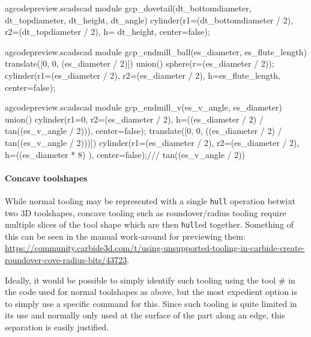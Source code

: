 \documentclass{ltxdoc}
\begin{document}
\lstset{firstnumber=\thegcpscad}
\begin{writecode}{a}{gcodepreview.scad}{scad}
module gcp_dovetail(dt_bottomdiameter, dt_topdiameter, dt_height, dt_angle) {
  cylinder(r1=(dt_bottomdiameter / 2), r2=(dt_topdiameter / 2), h= dt_height, center=false);
}

\end{writecode}
\addtocounter{gcpscad}{4}

\lstset{firstnumber=\thegcpscad}
\begin{writecode}{a}{gcodepreview.scad}{scad}
module gcp_endmill_ball(es_diameter, es_flute_length) {
  translate([0, 0, (es_diameter / 2)]){
    union(){
      sphere(r=(es_diameter / 2));
      cylinder(r1=(es_diameter / 2), r2=(es_diameter / 2), h=es_flute_length, center=false);
    }
  }
}

\end{writecode}
\addtocounter{gcpscad}{9}

\lstset{firstnumber=\thegcpscad}
\begin{writecode}{a}{gcodepreview.scad}{scad}
module gcp_endmill_v(es_v_angle, es_diameter) {
  union(){
    cylinder(r1=0, r2=(es_diameter / 2), h=((es_diameter / 2) / tan((es_v_angle / 2))), center=false);
    translate([0, 0, ((es_diameter / 2) / tan((es_v_angle / 2)))]){
      cylinder(r1=(es_diameter / 2), r2=(es_diameter / 2), h=((es_diameter * 8) ), center=false);/// tan((es_v_angle / 2))
    }
  }
}

\end{writecode}
\addtocounter{gcpscad}{9}
 
\paragraph{Concave toolshapes}

While normal tooling may be represented with a single \texttt{hull} operation betwixt two
3D toolshapes, concave tooling such as roundover/radius tooling require multiple slices
of the tool shape which are then \texttt{hull}ed together. Something of this can be seen
in the manual work-around for previewing them: 
\url{https://community.carbide3d.com/t/using-unsupported-tooling-in-carbide-create-roundover-cove-radius-bits/43723}.

Ideally, it would be possible to simply identify such tooling using the tool \# in the
code used for normal toolshapes as above, but the most expedient option is to simply
use a specific command for this. Since such tooling is quite limited in its use and 
normally only used at the surface of the part along an edge, this separation is 
easily justified.
\end{document}
